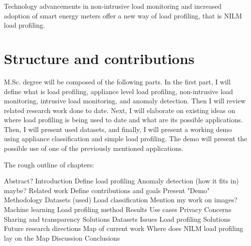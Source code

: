 
Technology advancements in non-intrusive load monitoring and increased adoption of smart energy meters offer a new
way of load profiling, that is NILM load profiling.


\section{Structure and contributions}
M.Sc. degree will be composed of the following parts. In the first part, I will define what is load profiling, appliance level load profiling, 
non-intrusive load monitoring, intrusive load monitoring, and anomaly detection. Then I will review related research work done to date. Next, I will elaborate 
on existing ideas on where load profiling is being used to date and what are its possible applications. Then, I will present used datasets, and finally,
I will present a working demo using appliance classification and simple load profiling.
The demo will present the possible use of one of the previously mentioned applications. 

The rough outline of chapters: 
\begin{outline}
	\1 Abstract?
	\1 Introduction
	\1 Define load profiling
	\1 Anomaly detection (how it fits in) maybe?
	\1 Related work
	\1 Define contributions and goals
	\1 Present "Demo"
	\1 Methodology
	\2 Datasets (used)
	\2 Load classification
	\3 Mention my work on images?
	\3 Machine learning
	\2 Load profiling method
	\1 Results
	\1 Use cases
	\1 Privacy
	\2 Concerns
	\2 Sharing and transparency
	\2 Solutions
	\1 Datasets
	\2 Issues 
	\2 Load profiling
	\2 Solutions
	\1 Future research directions
	\2 Map of current work
	\2 Where does NILM load profiling lay on the Map
	\1 Discussion
	\1 Conclusions
	
	\end{outline}